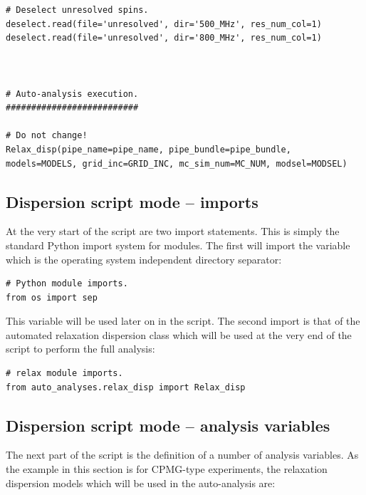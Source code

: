 \begin{lstlisting}
# Deselect unresolved spins.
deselect.read(file='unresolved', dir='500_MHz', res_num_col=1)
deselect.read(file='unresolved', dir='800_MHz', res_num_col=1)



# Auto-analysis execution.
##########################

# Do not change!
Relax_disp(pipe_name=pipe_name, pipe_bundle=pipe_bundle, models=MODELS, grid_inc=GRID_INC, mc_sim_num=MC_NUM, modsel=MODSEL)
\end{lstlisting}



\subsection{Dispersion script mode -- imports} \label{sect: dispersion script imports}

At the very start of the script are two import statements.  This is simply the standard Python import system for modules.  The first will import the  variable which is the operating system independent directory separator:

\begin{lstlisting}[firstnumber=4]
# Python module imports.
from os import sep
\end{lstlisting}

This  variable will be used later on in the script.  The second import is that of the automated relaxation dispersion class  which will be used at the very end of the script to perform the full analysis:

\begin{lstlisting}[firstnumber=7]
# relax module imports.
from auto_analyses.relax_disp import Relax_disp
\end{lstlisting}



\subsection{Dispersion script mode -- analysis variables} \label{sect: dispersion script variables}

The next part of the script is the definition of a number of analysis variables.  As the example in this section is for CPMG-type experiments, the relaxation dispersion models which will be used in the auto-analysis are:

